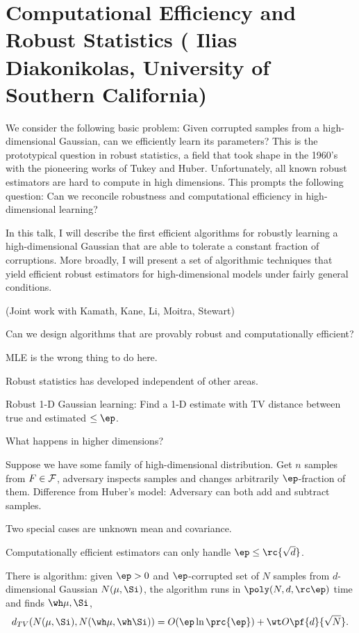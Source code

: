 \section{Computational Efficiency and Robust Statistics ( Ilias Diakonikolas, University of Southern California)}

We consider the following basic problem: Given corrupted samples from a high-dimensional Gaussian, can we efficiently learn its parameters? This is the prototypical question in robust statistics, a field that took shape in the 1960's with the pioneering works of Tukey and Huber. Unfortunately, all known robust estimators are hard to compute in high dimensions. This prompts the following question: Can we reconcile robustness and computational efficiency in high-dimensional learning?
 
In this talk, I will describe the first efficient algorithms for robustly learning a high-dimensional Gaussian that are able to tolerate a constant fraction of corruptions. More broadly, I will present a set of algorithmic techniques that yield efficient robust estimators for high-dimensional models under fairly general conditions.

(Joint work with Kamath, Kane, Li, Moitra, Stewart)

Can we design algorithms that are provably robust and computationally efficient?

MLE is the wrong thing to do here.

Robust statistics has developed independent of other areas.

Robust 1-D Gaussian learning: Find a 1-D estimate with TV distance between true and estimated $\le\ep$.

What happens in higher dimensions? 

Suppose  we have some family of high-dimensional distribution. Get $n$ samples from $F\in \cal F$, adversary inspects samples and changes arbitrarily $\ep$-fraction of them. 
Difference from Huber's model: 
Adversary can both add and subtract samples. 


Two special cases are unknown mean and covariance.

Computationally efficient estimators can only handle $\ep\le \rc{\sqrt d}$. 

There is algorithm: given $\ep>0$ and $\ep$-corrupted set of $N$ samples from $d$-dimensional Gaussian $N(\mu, \Si)$, the algorithm runs in $\poly(N, d, \rc \ep)$ time and finds $\wh \mu, \Si$, 
$$
d_{TV}(N(\mu, \Si), N(\wh \mu, \wh \Si)) = O(\ep \ln \prc{\ep}) + \wt O\pf{d}{\sqrt N}. 
$$

